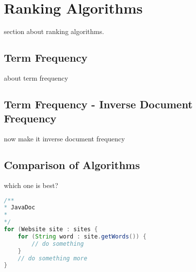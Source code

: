 \section{Ranking Algorithms}
section about ranking algorithms.

\subsection{Term Frequency}
about term frequency

\subsection{Term Frequency - Inverse Document Frequency}
now make it inverse document frequency


\subsection{Comparison of Algorithms}
which one is best?


\begin{lstlisting}[language=Java, caption=This is a code example.]
/**
* JavaDoc
*
*/
for (Website site : sites {
	for (String word : site.getWords()) {
		// do something	
	}
	// do something more
}
\end{lstlisting}